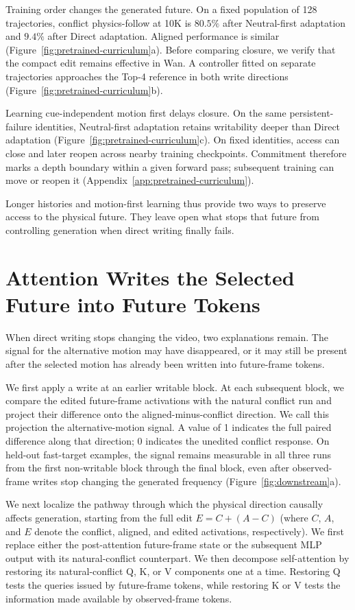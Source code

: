 \documentclass{article}
\newcommand{\resultlead}[1]{\par\noindent{\bfseries #1}\hspace{0.35em}}
\begin{document}
Training order changes the generated future. On a fixed population of
128 trajectories, conflict physics-follow at 10K is $80.5\%$ after Neutral-first
adaptation and $9.4\%$ after Direct adaptation. Aligned performance is similar
(Figure~\ref{fig:pretrained-curriculum}a). Before
comparing closure, we verify that the compact edit remains effective in
Wan. A controller fitted on separate trajectories approaches the Top-4
reference in both write directions (Figure~\ref{fig:pretrained-curriculum}b).

Learning cue-independent motion first delays closure. On the same
persistent-failure identities, Neutral-first adaptation retains writability
deeper than Direct adaptation
(Figure~\ref{fig:pretrained-curriculum}c). On fixed identities, access can close
and later reopen across nearby training checkpoints. Commitment therefore marks
a depth boundary within a given forward pass; subsequent training can move or
reopen it
(Appendix~\ref{app:pretrained-curriculum}).

Longer histories and motion-first learning thus provide two ways to preserve
access to the physical future. They leave open what stops that future from
controlling generation when direct writing finally fails.

\section{Attention Writes the Selected Future into Future Tokens}
\label{sec:downstream}
When direct writing stops changing the video, two explanations remain. The
signal for the alternative motion may have disappeared, or it may still be
present after the selected motion has already been written into future-frame
tokens.

\resultlead{The alternative-motion signal survives closure.} We first apply a write
at an earlier writable block. At each subsequent block, we compare the edited
future-frame activations with the natural conflict run and project their
difference onto the aligned-minus-conflict direction. We call this projection
the alternative-motion signal. A value of 1 indicates the full paired
difference along that direction; 0 indicates the unedited conflict response. On
held-out fast-target examples, the signal
remains measurable in all three runs from the first non-writable block through
the final block, even after observed-frame writes stop changing the generated
frequency (Figure~\ref{fig:downstream}a).

We next localize the pathway through which the physical direction causally
affects generation, starting from the full edit $E=C+(A-C)$
(where $C$, $A$, and $E$ denote the conflict, aligned,
and edited activations, respectively). We first replace either the
post-attention future-frame state or the subsequent MLP output with its
natural-conflict counterpart. We then decompose self-attention by restoring its
natural-conflict Q, K, or V
components one at a time. Restoring Q tests the queries issued by future-frame
tokens, while restoring K or V tests the information made available by
observed-frame tokens.
\end{document}
